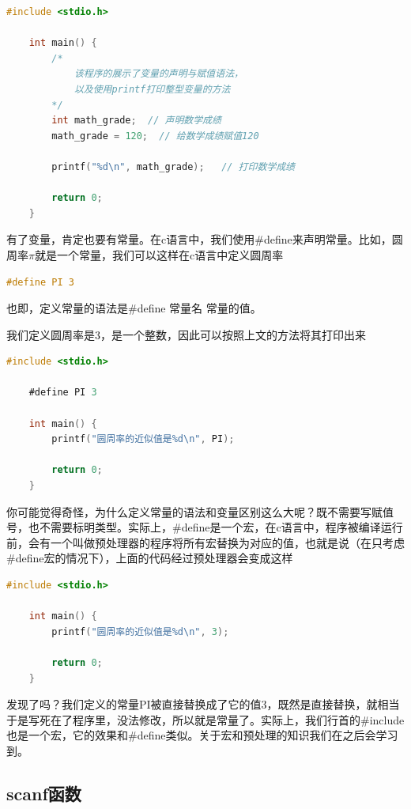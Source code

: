 \begin{lstlisting}[language=C]
    #include <stdio.h>

    int main() {
        /*
            该程序的展示了变量的声明与赋值语法，
            以及使用printf打印整型变量的方法
        */
        int math_grade;  // 声明数学成绩
        math_grade = 120;  // 给数学成绩赋值120

        printf("%d\n", math_grade);   // 打印数学成绩

        return 0;
    }
\end{lstlisting}

有了变量，肯定也要有常量。在c语言中，我们使用\#define来声明常量。比如，圆周率$\pi$就是一个常量，我们可以这样在c语言中定义圆周率

\begin{lstlisting}[language=C]
    #define PI 3 
\end{lstlisting}

也即，定义常量的语法是\#define 常量名 常量的值。

我们定义圆周率是3，是一个整数，因此可以按照上文的方法将其打印出来

\begin{lstlisting}[language=C]
    #include <stdio.h>

    #define PI 3

    int main() {
        printf("圆周率的近似值是%d\n", PI);

        return 0;
    }
\end{lstlisting}

你可能觉得奇怪，为什么定义常量的语法和变量区别这么大呢？既不需要写赋值号，也不需要标明类型。实际上，\#define是一个宏，在c语言中，程序被编译运行前，会有一个叫做预处理器的程序将所有宏替换为对应的值，也就是说（在只考虑\#define宏的情况下），上面的代码经过预处理器会变成这样

\begin{lstlisting}[language=C]
    #include <stdio.h>

    int main() {
        printf("圆周率的近似值是%d\n", 3);

        return 0;
    }
\end{lstlisting}

发现了吗？我们定义的常量PI被直接替换成了它的值$3$，既然是直接替换，就相当于是写死在了程序里，没法修改，所以就是常量了。实际上，我们行首的\#include也是一个宏，它的效果和\#define类似。关于宏和预处理的知识我们在之后会学习到。

\subsection{scanf函数}

